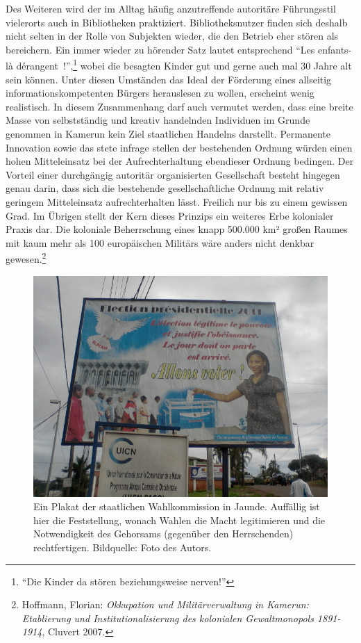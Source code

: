 \documentclass[a4paper,
fontsize=11pt,
oneside,
numbers=noperiodatend,
parskip=half-,
bibliography=totoc,
final
]{scrartcl}
\begin{document}
Des Weiteren wird der im Alltag häufig anzutreffende autoritäre
Führungsstil vielerorts auch in Bibliotheken praktiziert.
Bibliotheksnutzer finden sich deshalb nicht selten in der Rolle von
Subjekten wieder, die den Betrieb eher stören als bereichern. Ein immer
wieder zu hörender Satz lautet entsprechend \enquote{Les enfants-là
dérangent~!},\footnote{\enquote{Die Kinder da stören beziehungsweise
  nerven!}} wobei die besagten Kinder gut und gerne auch mal 30 Jahre
alt sein können. Unter diesen Umständen das Ideal der Förderung eines
allseitig informationskompetenten Bürgers herauslesen zu wollen,
erscheint wenig realistisch. In diesem Zusammenhang darf auch vermutet
werden, dass eine breite Masse von selbstständig und kreativ handelnden
Individuen im Grunde genommen in Kamerun kein Ziel staatlichen Handelns
darstellt. Permanente Innovation sowie das stete infrage stellen der
bestehenden Ordnung würden einen hohen Mitteleinsatz bei der
Aufrechterhaltung ebendieser Ordnung bedingen. Der Vorteil einer
durchgängig autoritär organisierten Gesellschaft besteht hingegen genau
darin, dass sich die bestehende gesellschaftliche Ordnung mit relativ
geringem Mitteleinsatz aufrechterhalten lässt. Freilich nur bis zu einem
gewissen Grad. Im Übrigen stellt der Kern dieses Prinzips ein weiteres
Erbe kolonialer Praxis dar. Die koloniale Beherrschung eines knapp
500.000 km² großen Raumes mit kaum mehr als 100 europäischen Militärs
wäre anders nicht denkbar gewesen.\footnote{Hoffmann, Florian:
  \emph{Okkupation und Militärverwaltung in Kamerun: Etablierung und
  Institutionalisierung des kolonialen Gewaltmonopols 1891-1914},
  Cluvert 2007.}

\begin{figure}[htbp]
\centering
\includegraphics{img/Wahlen.jpg}
\caption{Ein Plakat der staatlichen Wahlkommission in Jaunde. Auffällig
ist hier die Feststellung, wonach Wahlen die Macht legitimieren und die
Notwendigkeit des Gehorsams (gegenüber den Herrschenden) rechtfertigen.
Bildquelle: Foto des Autors.}
\end{figure}
\end{document}

